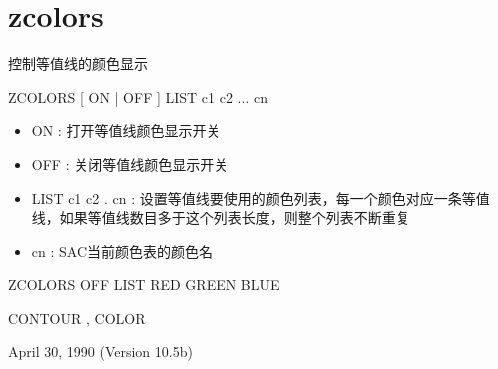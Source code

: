 \section{zcolors}
\label{cmd:zcolors}

控制等值线的颜色显示

ZCOLORS  [ ON | OFF ] LIST c1 c2 ... cn

\begin{itemize}
\item ON : 打开等值线颜色显示开关 
\item OFF : 关闭等值线颜色显示开关 
\item LIST c1 c2 . cn : 设置等值线要使用的颜色列表，每一个颜色对应一条等值线，如果等值线数目多于这个列表长度，则整个列表不断重复 
\item cn :  SAC当前颜色表的颜色名 
\end{itemize}

ZCOLORS OFF LIST RED GREEN BLUE

CONTOUR , COLOR

April 30, 1990 (Version 10.5b)

